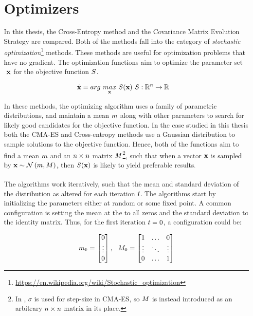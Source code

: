 \section{Optimizers \label{Optimizers}}

In this thesis, the Cross-Entropy method and the Covariance Matrix Evolution 
Strategy are compared. Both of the methods fall into the category of 
\textit{stochastic optimization}\footnote{\url{https://en.wikipedia.org/wiki/Stochastic_optimization}}
methods. These methods are useful for optimization problems that have no gradient.
The optimization functions aim to optimize the parameter set $\textbf{ \individual }$
for the objective function $S$.

\begin{align*}
\hat{\textbf{\individual }} &= 
arg \  \underset{\textbf{\individual }}{max} \  
\fitnessFunction (\textbf{\individual }) \ 
\fitnessFunction : \mathbb{R}^{\dimensions } \rightarrow \mathbb{R}
\end{align*}

In these methods, the optimizing algorithm uses a family of parametric distributions,
and maintain a mean $m $ along with other parameters
to search for likely good candidates for the objective function.  
In the case studied in this thesis
both the CMA-ES and Cross-entropy methods use a 
Gaussian distribution to sample solutions to the objective function.
Hence, both of the functions aim to find a mean 
$m $ and an $n \times n$ matrix 
$M $\footnote{In \citep{hansen2011}, 
$\sigma$ is used for step-size in CMA-ES, so $M $ is instead introduced
as an arbitrary $n \times n$ matrix in its place.}, such that when
a vector $\textbf{\individual }$ is sampled by 
$\textbf{x} \sim \mathcal{N}\left( m, M \right)$, 
then $S (\textbf{x})$ 
is likely to yield preferable results.\\
\\
The algorithms work iteratively, such that the mean and standard deviation of the distribution 
as altered for each iteration $t $.
The algorithms start by initializing the parameters either at random or some fixed point. A common 
configuration is setting the mean at the to all zeros and the standard deviation to the identity matrix.
Thus, for the first iteration $t = 0$, a configuration could be:

\begin{align*}
\mean_{0} =
\begin{bmatrix}
0\\
\vdots\\
0
\end{bmatrix},\ \ 
\varianceMatrix _{0} = 
\begin{bmatrix}
1 & \hdots & 0\\
\vdots & \ddots & \vdots\\
0 & \hdots & 1
\end{bmatrix}
\end{align*}

